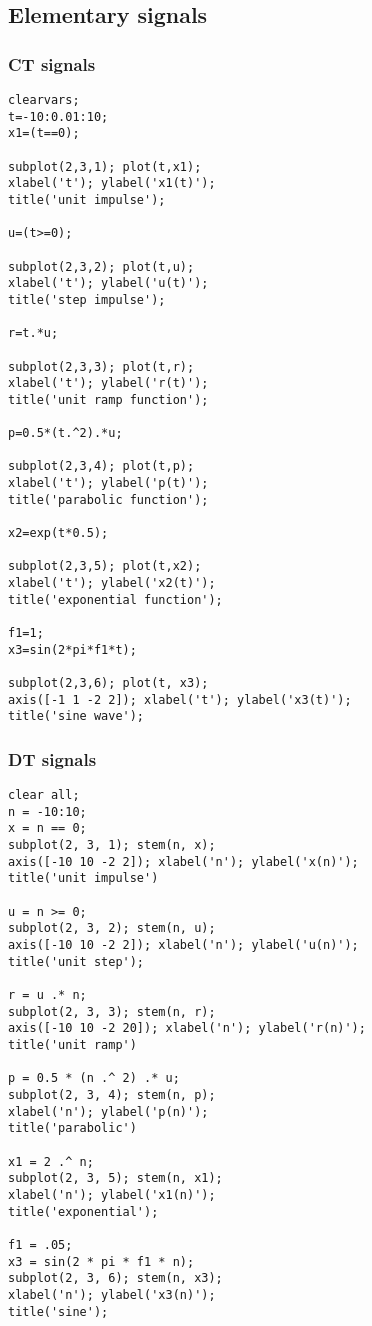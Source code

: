 \documentclass[12pt]{article}
\newcommand{\sectionc}[1]{\pagebreak {\centering \section{#1}} \vspace*{1cm}}
\begin{document}
\setlength{\cftbeforesecskip}{0.5em}  %
\setlength{\cftbeforesubsecskip}{0.3em}
\setlength{\cftbeforesubsubsecskip}{0.3em}
\tableofcontents

\sectionc{Signals}
\subsection{Elementary signals}
\subsubsection{CT signals}
\begin{verbatim}
clearvars;
t=-10:0.01:10;
x1=(t==0);

subplot(2,3,1); plot(t,x1);
xlabel('t'); ylabel('x1(t)');
title('unit impulse');

u=(t>=0);

subplot(2,3,2); plot(t,u);
xlabel('t'); ylabel('u(t)');
title('step impulse');

r=t.*u;

subplot(2,3,3); plot(t,r);
xlabel('t'); ylabel('r(t)');
title('unit ramp function');

p=0.5*(t.^2).*u;

subplot(2,3,4); plot(t,p);
xlabel('t'); ylabel('p(t)');
title('parabolic function');

x2=exp(t*0.5);

subplot(2,3,5); plot(t,x2);
xlabel('t'); ylabel('x2(t)');
title('exponential function');

f1=1;
x3=sin(2*pi*f1*t);

subplot(2,3,6); plot(t, x3);
axis([-1 1 -2 2]); xlabel('t'); ylabel('x3(t)');
title('sine wave');
\end{verbatim}

\subsubsection{DT signals}
\begin{verbatim}
clear all;
n = -10:10;
x = n == 0;
subplot(2, 3, 1); stem(n, x);
axis([-10 10 -2 2]); xlabel('n'); ylabel('x(n)');
title('unit impulse')

u = n >= 0;
subplot(2, 3, 2); stem(n, u);
axis([-10 10 -2 2]); xlabel('n'); ylabel('u(n)');
title('unit step');

r = u .* n;
subplot(2, 3, 3); stem(n, r);
axis([-10 10 -2 20]); xlabel('n'); ylabel('r(n)');
title('unit ramp')

p = 0.5 * (n .^ 2) .* u;
subplot(2, 3, 4); stem(n, p);
xlabel('n'); ylabel('p(n)');
title('parabolic')

x1 = 2 .^ n;
subplot(2, 3, 5); stem(n, x1);
xlabel('n'); ylabel('x1(n)');
title('exponential');

f1 = .05;
x3 = sin(2 * pi * f1 * n);
subplot(2, 3, 6); stem(n, x3);
xlabel('n'); ylabel('x3(n)');
title('sine');
\end{verbatim}
\end{document}
